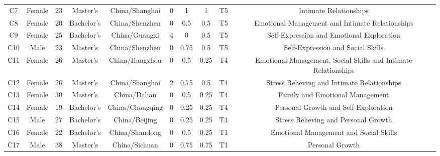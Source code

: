 \begin{table*}[tb]
{\begin{tabular}{cccccccccc}
C7  & Female & 23  & Master's   & China/Shanghai & 0                            & 1                                   & 1     &T5     &  Intimate Relationships                    \\
C8  & Female & 20  & Bachelor's & China/Shenzhen & 0                            & 0.5                                   & 0.5    &T5   &  Emotional Management and Intimate Relationships                       \\
C9  & Female & 25  & Bachelor's & China/Guangxi  & 4                            & 0                                   & 0.5    &T5    &  Self-Expression and Emotional Exploration                      \\
C10 & Male   & 23  & Master's   & China/Shenzhen & 0                            & 0.75                                   & 0.5   &T5   &             Self-Expression and Social Skills             \\
C11 & Female & 26  & Master's   & China/Hangzhou & 0                            & 0.5                                   & 0.25    &T4  &        Emotional Management, Social Skills and Intimate Relationships                 \\
C12 & Female & 26  & Master's   & China/Shanghai & 2                            & 0.75                                   & 0.5    &T4   &                   Stress Relieving and Intimate Relationships  \\
C13 & Female & 30  & Master's   & China/Dalian   & 0                            & 0.5                                   & 0.25   &T4    &             Family and Emotional Management            \\
C14 & Female & 19  & Bachelor's & China/Chongqing & 0                            & 0.25                                   & 0.25   &T4  &                Personal Growth and Self-Exploration           \\
C15 & Male   & 27  & Bachelor's & China/Beijing  & 0                            & 0.25                                  & 0.25   &T4    &                 Stress Relieving and Personal Growth        \\
C16 & Female & 22  & Bachelor's & China/Shandong & 0                            & 0.5                                   & 0.25   &T1     &              Emotional Management and Social Skills       \\
C17 & Male   & 38  & Master's   & China/Sichuan  & 0                            & 0.75                                   & 0.75   &T1     &                    Personal Growth      \\

\end{tabular}}
\end{table*}
